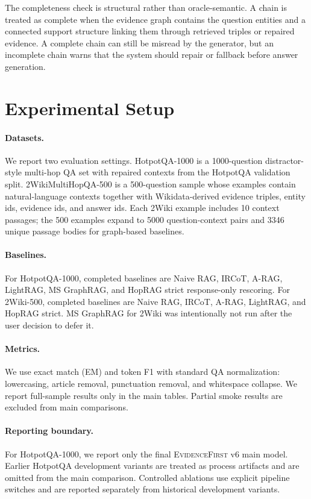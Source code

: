 \documentclass[runningheads]{llncs}
\newcommand{\sys}{\textsc{EvidenceFirst}\xspace}
\begin{document}
The completeness check is structural rather than oracle-semantic. A chain is
treated as complete when the evidence graph contains the question entities and
a connected support structure linking them through retrieved triples or
repaired evidence. A complete chain can still be misread by the generator, but
an incomplete chain warns that the system should repair or fallback before
answer generation.

\section{Experimental Setup}
\label{sec:setup}

\paragraph{Datasets.}
We report two evaluation settings. HotpotQA-1000 is a 1000-question
distractor-style multi-hop QA set with repaired contexts from the HotpotQA
validation split. 2WikiMultiHopQA-500 is a 500-question sample whose examples
contain natural-language contexts together with Wikidata-derived evidence
triples, entity ids, evidence ids, and answer ids. Each 2Wiki example includes
10 context passages; the 500 examples expand to 5000 question-context pairs and
3346 unique passage bodies for graph-based baselines.

\paragraph{Baselines.}
For HotpotQA-1000, completed baselines are Naive RAG, IRCoT, A-RAG, LightRAG,
MS GraphRAG, and HopRAG strict response-only rescoring.
For 2Wiki-500, completed baselines are Naive RAG, IRCoT, A-RAG, LightRAG, and
HopRAG strict. MS GraphRAG for 2Wiki was intentionally not run after the user
decision to defer it.

\paragraph{Metrics.}
We use exact match (EM) and token F1 with standard QA normalization:
lowercasing, article removal, punctuation removal, and whitespace collapse. We
report full-sample results only in the main tables. Partial smoke results are
excluded from main comparisons.

\paragraph{Reporting boundary.}
For HotpotQA-1000, we report only the final \sys v6 main model. Earlier
HotpotQA development variants are treated as process artifacts and are omitted
from the main comparison. Controlled ablations use explicit pipeline switches
and are reported separately from historical development variants.
\end{document}
